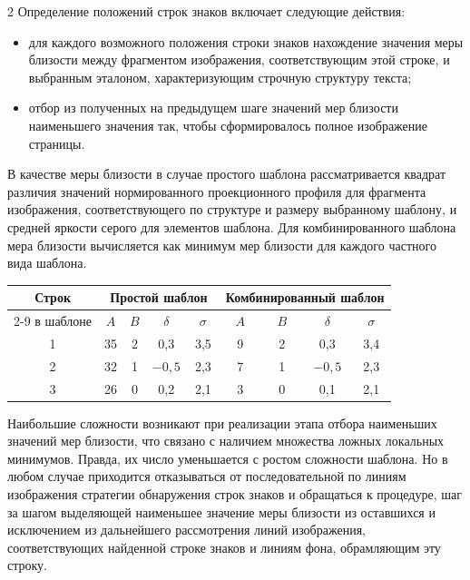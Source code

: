 \begin{multicols}{2}
      Определение положений строк знаков включает следующие действия:
      \begin{itemize}
\item для каждого возможного положения строки знаков нахождение значения меры 
близости между фрагментом изображения, соответствующим этой строке, и 
выбранным эталоном, характеризующим строчную структуру текста;
\item отбор из полученных на предыдущем шаге значений мер близости наименьшего 
значения так, чтобы сформировалось полное изображение страницы.
      \end{itemize}
      
      В качестве меры близости в случае простого шаблона рассматривается квадрат 
различия значений нормированного проекционного профиля для фрагмента изображения, 
соответствующего по структуре и размеру выбранному шаблону, и средней яркости 
серого для элементов шаблона. Для комбинированного шаблона мера близости 
вы\-чис\-ля\-ет\-ся как минимум мер близости для каждого частного вида шаблона.

 \begin{table}\small
       \begin{center}
       \vspace*{2ex}
       
       \begin{tabular}{|c|c|c|c|c|c|c|c|c|}
       \hline
Строк &\multicolumn{4}{c|}{Простой шаблон}&\multicolumn{4}{c|}{Комбинированный 
шаблон}\\
\cline{2-9}
в шаблоне&$A$&$B$&$\delta$&\ $\sigma$\ &\ $A$\ &\ $B$\ &\ $\delta$\ &\ $\sigma$\ \\
\hline
1&35&2&0,3&3,5&9&2&0,3&3,4\\
2&32&1&$-0{,}5$\hphantom{$-$}&2,3&7&1&$-0{,}5$\hphantom{$-$}&2,3\\
3&26&0&0,2&2,1&3&0&0,1&2,1\\
\hline
\end{tabular}
\end{center}
\end{table}

      
      Наибольшие сложности возникают при реализации этапа отбора наименьших 
значений мер близости, что связано с наличием множества ложных локальных 
минимумов. Правда, их число уменьшается с ростом сложности шаблона. Но в любом 
случае приходится отказываться от последовательной по линиям изображения стратегии 
обнаружения строк знаков и обращаться к процедуре, шаг за шагом выделяющей 
наименьшее значение меры близости из оставшихся и исключением из дальнейшего 
рассмотрения линий изображения, соответствующих найденной строке знаков и линиям 
фона, обрамляющим эту строку. 
      

\end{multicols}
